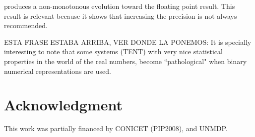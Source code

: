 produces a non-monotonous evolution toward the floating point result. This result is relevant because it shows that increasing the precision is not
always recommended.

ESTA FRASE ESTABA ARRIBA, VER DONDE LA PONEMOS: It is specially interesting to note that some systems (TENT) with very nice statistical properties in the world of the real numbers, become ``pathological" when binary numerical representations are used.

\section*{Acknowledgment}
This work was partially financed by CONICET (PIP2008),  and UNMDP.
